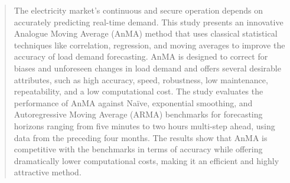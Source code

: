 \documentclass[journal, twoside]{IEEEtran}
\begin{document}


% 











\maketitle

\begin{abstract} 
The electricity market’s continuous and secure operation depends on accurately predicting real-time demand. This study presents an innovative Analogue Moving Average (AnMA) method that uses classical statistical techniques like correlation, regression, and moving averages to improve the accuracy of load demand forecasting. AnMA is designed to correct for biases and unforeseen changes in load demand and offers several desirable attributes, such as high accuracy, speed, robustness, low maintenance, repeatability, and a low computational cost. The study evaluates the performance of AnMA against Naïve, exponential smoothing, and Autoregressive Moving Average (ARMA) benchmarks for forecasting horizons ranging from five minutes to two hours multi-step ahead, using data from the preceding four months. The results show that AnMA is competitive with the benchmarks in terms of accuracy while offering dramatically lower computational costs, making it an efficient and highly attractive method.
\end{abstract}
\end{document}
